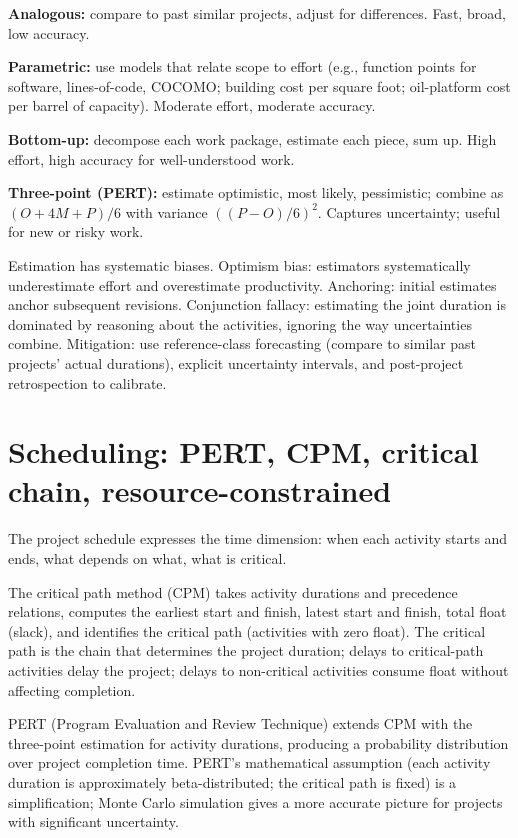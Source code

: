 \textbf{Analogous:} compare to past similar projects, adjust for differences. Fast, broad, low accuracy.

\textbf{Parametric:} use models that relate scope to effort (e.g., function points for software, lines-of-code, COCOMO; building cost per square foot; oil-platform cost per barrel of capacity). Moderate effort, moderate accuracy.

\textbf{Bottom-up:} decompose each work package, estimate each piece, sum up. High effort, high accuracy for well-understood work.

\textbf{Three-point (PERT):} estimate optimistic, most likely, pessimistic; combine as $(O + 4M + P)/6$ with variance $((P - O)/6)^2$. Captures uncertainty; useful for new or risky work.

Estimation has systematic biases. Optimism bias: estimators systematically underestimate effort and overestimate productivity. Anchoring: initial estimates anchor subsequent revisions. Conjunction fallacy: estimating the joint duration is dominated by reasoning about the activities, ignoring the way uncertainties combine. Mitigation: use reference-class forecasting (compare to similar past projects' actual durations), explicit uncertainty intervals, and post-project retrospection to calibrate.

\section{Scheduling: PERT, CPM, critical chain, resource-constrained}

The project schedule expresses the time dimension: when each activity starts and ends, what depends on what, what is critical.

The critical path method (CPM) takes activity durations and precedence relations, computes the earliest start and finish, latest start and finish, total float (slack), and identifies the critical path (activities with zero float). The critical path is the chain that determines the project duration; delays to critical-path activities delay the project; delays to non-critical activities consume float without affecting completion.

PERT (Program Evaluation and Review Technique) extends CPM with the three-point estimation for activity durations, producing a probability distribution over project completion time. PERT's mathematical assumption (each activity duration is approximately beta-distributed; the critical path is fixed) is a simplification; Monte Carlo simulation gives a more accurate picture for projects with significant uncertainty.


